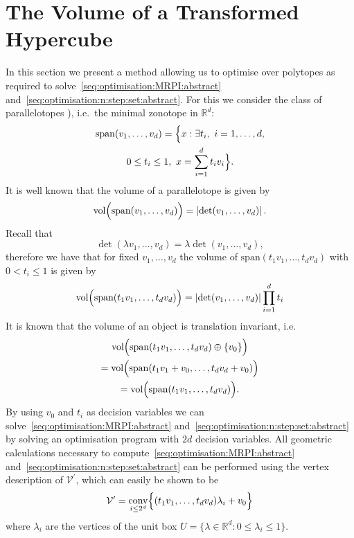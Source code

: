 \documentclass{ifacconf}
\providecommand{\abs}[1]{\left|#1\right|}
\providecommand{\conv}{\text{conv}}
\providecommand{\vol}{\text{vol}}
\providecommand{\spann}{\text{span}}
\providecommand{\V}{\mathcal V}
\providecommand{\RR}{\mathbb R}
\begin{document}
\section{The Volume of a Transformed Hypercube}\label{sec:volume:of:hypercube}
%
%
In this section we present a method allowing us to optimise over polytopes as required to solve~\eqref{seq:optimisation:MRPI:abstract} and~\eqref{seq:optimisation:n:step:set:abstract}.
%
For this we consider the class of parallelotopes \citep[see
e.g.][]{Coxeter:1973}), i.e.~the minimal zonotope in $\RR^d$: 
\begin{multline*}
  \spann(v_1,\dots,v_d) = \Bigl\{x:\exists t_i, \ 
i = 1,\ldots, d, \\
0 \leq t_i\leq1, \ 
 x = \sum_{i=1}^dt_iv_i\Bigr\}.
\end{multline*}
%
It is well known that the volume of a parallelotope is given by
%
\begin{equation}
	\vol\Bigl(\spann(v_1,\dots,v_d)\Bigr) = \abs{\det(v_1,\dots,v_d)}.
\end{equation}
%
Recall that 
\[
\det(\lambda v_1,\dots,v_d) = \lambda\det(v_1,\dots,v_d),
\]
therefore we have that for fixed $v_1,\dots,v_d$ the volume of $\spann(t_1v_1,\dots,t_dv_d)$ with $0<t_i\leq1$ is given by
%
\begin{equation}
	\vol\Bigl(\spann(t_1v_1,\dots,t_dv_d)\Bigr) = \abs{\det(v_1,\dots,v_d)}\prod_{i=1}^d t_i
\end{equation}
%
It is known that the volume of an object is translation invariant, i.e. 
\begin{multline*}
\vol\Bigl(\spann(t_1v_1,\dots,t_dv_d)\oplus\{v_0\}\Bigr) \\
= \vol\Bigl(\spann(t_1v_1+v_0,\dots,t_dv_d+v_0)\Bigr) \\
= \vol\Bigl(\spann(t_1v_1,\dots,t_dv_d)\Bigr).
\end{multline*}
By using $v_0$ and $t_i$ as decision variables we can solve~\eqref{seq:optimisation:MRPI:abstract} and~\eqref{seq:optimisation:n:step:set:abstract} by solving an optimisation program with $2d$ decision variables.
%
All geometric calculations necessary to compute~\eqref{seq:optimisation:MRPI:abstract} and~\eqref{seq:optimisation:n:step:set:abstract} can be performed using the vertex description of $\V^\prime$, which can easily be shown to be
%
\begin{equation}
	\V^\prime = \underset{i\leq 2^d}{\conv}\Bigl\{(t_1v_1,\dots,t_dv_d)\lambda_i+v_0\Bigr\}
\end{equation}
%
where $\lambda_i$ are the vertices of the unit box $U = \{\lambda\in\RR^d:0\leq\lambda_i\leq 1\}$.
\end{document}
